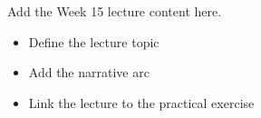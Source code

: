 Add the Week 15 lecture content here.

\begin{itemize}
  \item Define the lecture topic
  \item Add the narrative arc
  \item Link the lecture to the practical exercise
\end{itemize}
